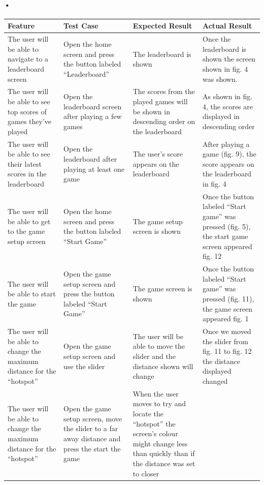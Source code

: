 \documentclass[10pt, a4paper]{article}
\begin{document}
\paragraph*{•}
\begin{tabular}{| p{} | p{} | p{} | p{} |}
\hline 
\textbf{Feature}
& \textbf{Test Case}
& \textbf{Expected Result}
& \textbf{Actual Result} \\ 
\hline 
The user will be able to navigate to a leaderboard screen
& Open the home screen and press the button labeled ``Leaderboard''
& The leaderboard is shown
& Once the leaderboard is shown the screen shown in fig. 4 was shown. \\ 
\hline 
The user will be able to see top scores of games they've played
& Open the leaderboard screen after playing a few games
& The scores from the played games will be shown in descending order on the leaderboard
& As shown in fig. 4, the scores are displayed in descending order \\ 
\hline 
The user will be able to see their latest scores in the leaderboard
& Open the leaderboard after playing at least one game
& The user's score appears on the leaderboard
& After playing a game (fig. 9), the score appears on the leaderboard in fig. 4 \\ 
\hline 
The user will be able to get to the game setup screen
& Open the home screen and press the button labeled ``Start Game''
& The game setup screen is shown
& Once the button labeled ``Start game'' was pressed (fig. 5), the start game screen appeared fig. 12 \\ 
\hline 
The user will be able to start the game
& Open the game setup screen and press the button labeled ``Start Game''
& The game screen is shown
& Once the button labeled ``Start game'' was pressed (fig. 11), the game screen appeared fig. 1 \\ 
\hline 
The user will be able to change the maximum distance for the ``hotspot''
& Open the game setup screen and use the slider
& The user will be able to move the slider and the distance shown will change
& Once we moved the slider from fig. 11 to fig. 12 the distance displayed changed \\ 
\hline 
The user will be able to change the maximum distance for the ``hotspot''
& Open the game setup screen, move the slider to a far away distance and press the start the game
& When the user moves to try and locate the ``hotspot'' the screen's colour might change less than quickly than if the distance was set to closer

\end{tabular}
\end{document}
